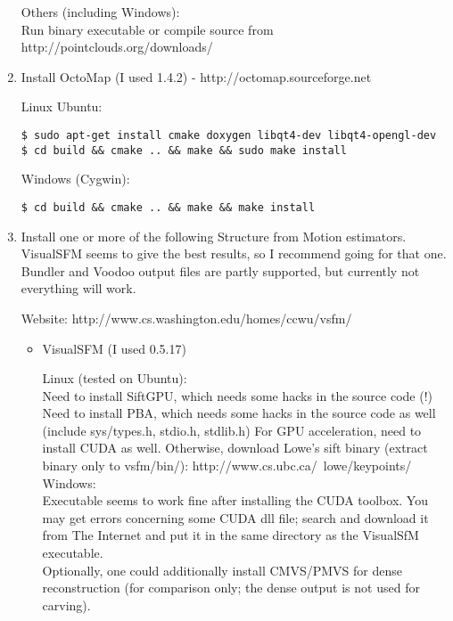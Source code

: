 \begin{enumerate}
    Others (including Windows): \\
     Run binary executable or compile source from http://pointclouds.org/downloads/


\item Install OctoMap (I used 1.4.2) - http://octomap.sourceforge.net

    Linux Ubuntu:
    \begin{verbatim}
$ sudo apt-get install cmake doxygen libqt4-dev libqt4-opengl-dev
$ cd build && cmake .. && make && sudo make install
    \end{verbatim}

    Windows (Cygwin):
    \begin{verbatim}
$ cd build && cmake .. && make && make install
    \end{verbatim}


\item Install one or more of the following Structure from Motion estimators.
   VisualSFM seems to give the best results, so I recommend going for that one.
   Bundler and Voodoo output files are partly supported, but currently not
   everything will work.

   Website: http://www.cs.washington.edu/homes/ccwu/vsfm/

   \begin{itemize}
   \item VisualSFM (I used 0.5.17)

        Linux (tested on Ubuntu): \\
          Need to install SiftGPU, which needs some hacks in the source code (!)
          Need to install PBA, which needs some hacks in the source code as well
          (include sys/types.h, stdio.h, stdlib.h)
          For GPU acceleration, need to install CUDA as well.
          Otherwise, download Lowe's sift binary (extract binary only to vsfm/bin/):
          http://www.cs.ubc.ca/~lowe/keypoints/ \\

        Windows: \\
          Executable seems to work fine after installing the CUDA toolbox. You may
          get errors concerning some CUDA dll file; search and download it from
          The Internet and put it in the same directory as the VisualSfM executable. \\

        Optionally, one could additionally install CMVS/PMVS for dense reconstruction
        (for comparison only; the dense output is not used for carving).


\end{itemize}
\end{enumerate}
